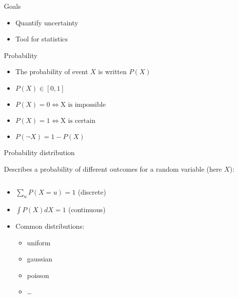 \begin{frame}{Goals}
  \begin{itemize}
  \item Quantify uncertainty
  \item Tool for statistics
  \end{itemize}
\end{frame}

\begin{frame}{Probability}

  \begin{itemize}
  \item The probability of event $X$ is written $P(X)$
  \item $P(X) \in [0, 1]$
  \item $P(X)=0 \iff \text{X is impossible}$
  \item $P(X)=1 \iff \text{X is certain}$
  \item $P(\neg X) = 1 - P(X)$
  \end{itemize}
\end{frame}

\begin{frame}{Probability distribution}

  Describes a probability of different outcomes for a random variable (here $X$):
  \begin{columns}
    \begin{column}{.5\textwidth}
      \begin{itemize}
      \item $\sum_uP(X = u) = 1$ (discrete)
      \item $\int P(X)dX = 1$ (continuous)
      \item Common distributions:
        \begin{itemize}
        \item uniform
        \item gaussian
        \item poisson
        \item …
        \end{itemize}
      \end{itemize}
    \end{column}
    \begin{column}{.5\textwidth}
    \end{column}
  \end{columns}
\end{frame}
